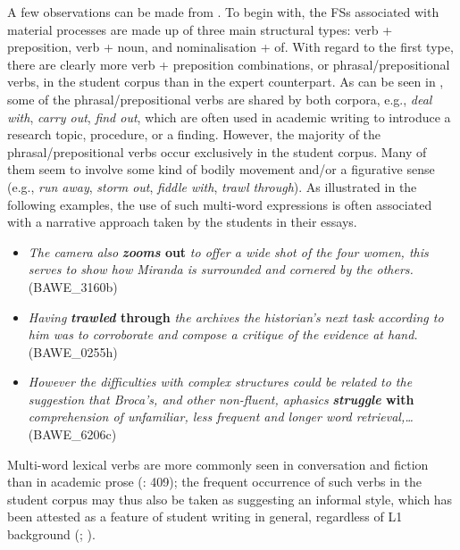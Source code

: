 \documentclass[output=paper]{langsci/langscibook}
\begin{document}
A few observations can be made from . To begin with, the FSs associated with material processes are made up of three main structural types: verb + preposition, verb + noun, and nominalisation + of. With regard to the first type, there are clearly more verb + preposition combinations, or phrasal/prepositional verbs, in the student corpus than in the expert counterpart. As can be seen in , some of the phrasal/prepositional verbs are shared by both corpora, e.g., \textit{deal with}, \textit{carry out}, \textit{find out}, which are often used in academic writing to introduce a research topic, procedure, or a finding. However, the majority of the phrasal/prepositional verbs occur exclusively in the student corpus. Many of them seem to involve some kind of bodily movement and/or a figurative sense (e.g., \textit{run away}, \textit{storm out}, \textit{fiddle with}, \textit{trawl through}). As illustrated in the following examples, the use of such multi-word expressions is often associated with a narrative approach taken by the students in their essays. 

\begin{itemize}
\item \begin{styleListParagraph}
\textit{The camera also} \textbf{\textit{zooms} \textbf{out}} \textit{to offer a wide shot of the four women, this serves to show how Miranda is surrounded and cornered by the others.} (BAWE\_3160b)
\end{styleListParagraph}
\item \begin{styleListParagraph}
\textit{Having} \textbf{\textit{trawled} \textbf{through}} \textit{the archives the historian’s next task according to him was to corroborate and compose a critique of the evidence at hand.} (BAWE\_0255h)
\end{styleListParagraph}
\item \begin{styleListParagraph}
\textit{However the difficulties with complex structures could be related to the suggestion that Broca’s, and other non-fluent, aphasics} \textbf{\textit{struggle} \textbf{with}} \textit{comprehension of unfamiliar, less frequent and longer word retrieval,…} (BAWE\_6206c)
\end{styleListParagraph}
\end{itemize}

Multi-word lexical verbs are more commonly seen in conversation and fiction than in academic prose (\citealt{BiberEtAl1999}: 409); the frequent occurrence of such verbs in the student corpus may thus also be taken as suggesting an informal style, which has been attested as a feature of student writing in general, regardless of L1 background (\citealt{GrangerRayson1998}; \citealt{GilquinPaquot2008}). 
\end{document}
